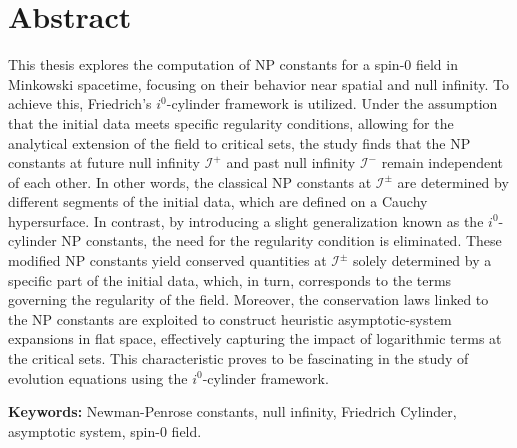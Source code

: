 
\section*{Abstract}


This thesis explores the computation of NP constants for a spin-0 field in Minkowski spacetime, focusing on their behavior near spatial and null infinity. To achieve this, Friedrich's $i^0$-cylinder framework is utilized. Under the assumption that the initial data meets specific regularity conditions, allowing for the analytical extension of the field to critical sets, the study finds that the NP constants at future null infinity $\mathscr{I}^{+}$ and past null infinity $\mathscr{I}^{-}$ remain independent of each other. In other words, the classical NP constants at $\mathscr{I}^{\pm}$ are determined by different segments of the initial data, which are defined on a Cauchy hypersurface.
In contrast, by introducing a slight generalization known as the $i^0$-cylinder NP constants, the need for the regularity condition is eliminated. These modified NP constants yield conserved quantities at $\mathscr{I}^{\pm}$ solely determined by a specific part of the initial data, which, in turn, corresponds to the terms governing the regularity of the field. Moreover, the conservation laws linked to the NP constants are exploited to construct heuristic asymptotic-system expansions in flat space, effectively capturing the impact of logarithmic terms at the critical sets. This characteristic proves to be fascinating in the study of evolution equations using the $i^0$-cylinder framework.

\vfill

\textbf{\Large Keywords:} Newman-Penrose constants, null infinity, Friedrich Cylinder, asymptotic system, spin-0 field.

